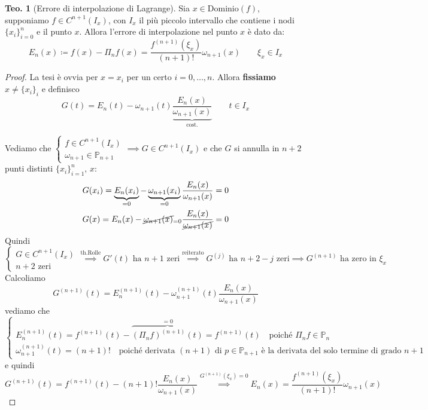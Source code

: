 \documentclass[a4paper,10pt]{article}
\theoremstyle{definition}
\theoremstyle{indentdefinition}
\theoremstyle{indenttheorem}
\newtheorem{thm}{Teo.}
\theoremstyle{myremark}
\theoremstyle{indentgeneral}
\theoremstyle{plain}
\theoremstyle{plain}
\newenvironment{myboxed} 
{\noindent\begin{lrbox}{\mybox}\begin{minipage}{\textwidth}}
{\end{minipage}\end{lrbox}\fbox{\usebox{\mybox}}}
\begin{document}
\begin{myboxed}
\begin{thm}[Errore di interpolazione di Lagrange]
\label{thm:errore-lagrange}Sia $x\in \text{Dominio}(f)$, supponiamo  $f\in C^{n+1}(I_x)$, con $I_x$ il più piccolo intervallo che contiene i nodi $\{x_i\}_{i=0}^n$ e il punto $x$. Allora l'errore di interpolazione nel punto $x$ è dato da:
$$E_{n}\left(x\right)\coloneqq f\left(x\right)-\Pi_{n}f\left(x\right)=\frac{f^{\left(n+1\right)}\left(\xi_x\right)}{\left(n+1\right)!}\omega_{n+1}\left(x\right)\qquad \xi_x\in I_x$$
\end{thm}
\end{myboxed}

\begin{proof} La tesi è ovvia per $x=x_i$ per un certo $i=0,\dots,n$. Allora \textbf{fissiamo} $x\ne \{x_i\}_i$ e definisco
$$G(t)=E_n(t)-\omega_{n+1}(t)\underbrace{\frac{E_n(x)}{\omega_{n+1}(x)}}_{\text{cost.}}\quad\quad t\in I_x$$

Vediamo che $\begin{cases}
    f\in C^{n+1}(I_x) \\
    \omega_{n+1}\in\mathbb{P}_{n+1}
\end{cases}\implies G\in C^{n+1}(I_x)$ e che $G$ si annulla in $n+2$ punti distinti $\{x_i\}_{i=1}^n,\,x$:
\begin{align*}
    G(x_i)=\underbrace{E_n(x_i)}_{=0}-\underbrace{\omega_{n+1}(x_i)}_{=0}\frac{E_n(x)}{\omega_{n+1}(x)}=0\\
    G(x)={E_n(x)}-\cancel{\omega_{n+1}(x)}_{=0}\frac{E_n(x)}{\cancel{\omega_{n+1}(x)}}=0\\
\end{align*}
Quindi
$$\begin{cases}
    G\in C^{n+1}(I_x) \\
    n+2\text{ zeri}
\end{cases}\overset{\text{th.Rolle}}{\implies} G'(t) \text{ ha }n+1 \text{ zeri}\overset{\text{reiterato}}{\implies}G^{(j)}\text{ ha }n+2-j \text{ zeri}\implies G^{(n+1)}\text{ ha zero in }\xi_x$$
Calcoliamo
$$G^{(n+1)}(t)=E_n^{(n+1)}(t)-\omega_{n+1}^{(n+1)}(t)\frac{E_n(x)}{\omega_{n+1}(x)}$$
vediamo che
$$\begin{cases}
    E_n^{(n+1)}(t)=f^{(n+1)}(t)-\overbrace{(\Pi_nf)^{(n+1)}(t)}^{=0}= f^{(n+1)}(t) \quad \text{poiché }\Pi_nf\in\mathbb{P}_n\\
    \omega_{n+1}^{(n+1)}(t)=(n+1)! \quad \text{poiché derivata $(n+1)$ di $p\in\mathbb{P}_{n+1}$ è la derivata del solo termine di grado $n+1$}
\end{cases}$$
e quindi
$$G^{(n+1)}(t)=f^{(n+1)}(t)-(n+1)!\frac{E_n(x)}{\omega_{n+1}(x)}\overset{G^{(n+1)}(\xi_x)=0}{\implies}E_n(x)=\frac{f^{(n+1)}(\xi_x)}{(n+1)!}\omega_{n+1}(x)$$
\end{proof}
\end{document}
